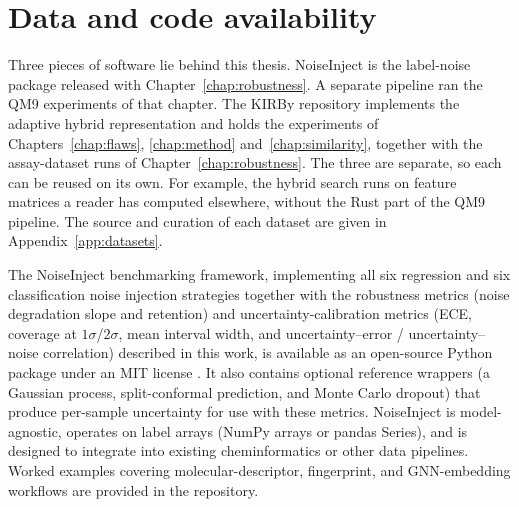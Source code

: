 \chapter{Data and code availability}\label{app:availability}

Three pieces of software lie behind this thesis. NoiseInject is the label-noise package released with Chapter~\ref{chap:robustness}. A separate pipeline ran the QM9 experiments of that chapter. The KIRBy repository implements the adaptive hybrid representation and holds the experiments of Chapters~\ref{chap:flaws}, \ref{chap:method} and~\ref{chap:similarity}, together with the assay-dataset runs of Chapter~\ref{chap:robustness}. The three are separate, so each can be reused on its own. For example, the hybrid search runs on feature matrices a reader has computed elsewhere, without the Rust part of the QM9 pipeline. The source and curation of each dataset are given in Appendix~\ref{app:datasets}.

The NoiseInject benchmarking framework, implementing all six regression and six classification noise injection strategies together with the robustness metrics (noise degradation slope and retention) and uncertainty-calibration metrics (ECE, coverage at $1\sigma$/$2\sigma$, mean interval width, and uncertainty--error / uncertainty--noise correlation) described in this work, is available as an open-source Python package under an MIT license \citep{noiseinject}. It also contains optional reference wrappers (a Gaussian process, split-conformal prediction, and Monte Carlo dropout) that produce per-sample uncertainty for use with these metrics. NoiseInject is model-agnostic, operates on label arrays (NumPy arrays or pandas Series), and is designed to integrate into existing cheminformatics or other data pipelines. Worked examples covering molecular-descriptor, fingerprint, and GNN-embedding workflows are provided in the repository.

